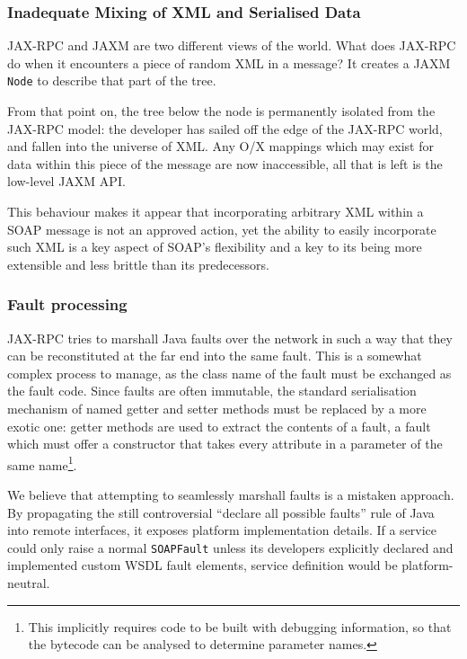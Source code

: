 \subsubsection{Inadequate Mixing of XML and Serialised Data}
\label{objections:o-x:mixing}

JAX-RPC and JAXM are two different views of the world. What does JAX-RPC
do when it encounters a piece of random XML in a message? It creates a
JAXM {\tt Node} to describe that part of the tree.

From that point on, the tree below the node is permanently isolated
from the JAX-RPC model: the developer has sailed off the edge of the
JAX-RPC world, and fallen into the universe of XML. Any O/X mappings
which may exist for data within this piece of the message are now
inaccessible, all that is left is the low-level JAXM API. 

This behaviour makes it appear that incorporating arbitrary XML within
a SOAP message is not an approved action, yet the ability to easily
incorporate such XML is a key aspect of SOAP's flexibility and a key
to its being more extensible and less brittle than its predecessors.

\subsubsection{Fault processing}
\label{objections:soap-not-rmi:faults}

JAX-RPC tries to marshall Java faults over the network in such a way
that they can be reconstituted at the far end into the same fault.
This is a somewhat complex process to manage, as the class name of the
fault must be exchanged as the fault code. Since faults are often
immutable, the standard serialisation mechanism of named getter and
setter methods must be replaced by a more exotic one: getter methods
are used to extract the contents of a fault, a fault which must offer
a constructor that takes every attribute in a parameter of the same
name\footnote{This implicitly requires code to be built with debugging
information, so that the bytecode can be analysed to determine
parameter names.}.

We believe that attempting to seamlessly marshall faults is a mistaken
approach.  By propagating the still controversial ``declare all
possible faults'' rule of Java into remote interfaces, it exposes
platform implementation details. If a service could only raise a
normal {\tt SOAPFault} unless its developers explicitly declared and
implemented custom WSDL fault elements, service definition would be
platform-neutral.

